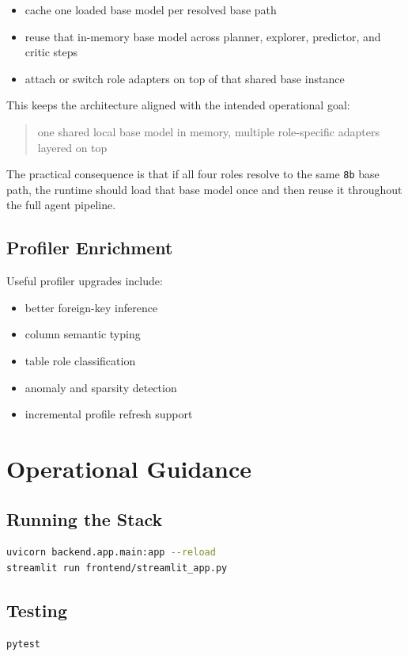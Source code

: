 \documentclass[11pt]{book}
\begin{document}
\begin{itemize}
\item cache one loaded base model per resolved base path
\item reuse that in-memory base model across planner, explorer, predictor, and critic steps
\item attach or switch role adapters on top of that shared base instance
\end{itemize}

This keeps the architecture aligned with the intended operational goal:

\begin{quote}
one shared local base model in memory, multiple role-specific adapters layered on top
\end{quote}

The practical consequence is that if all four roles resolve to the same \texttt{8b} base path, the
runtime should load that base model once and then reuse it throughout the full agent pipeline.

\section{Profiler Enrichment}
Useful profiler upgrades include:

\begin{itemize}
\item better foreign-key inference
\item column semantic typing
\item table role classification
\item anomaly and sparsity detection
\item incremental profile refresh support
\end{itemize}

\chapter{Operational Guidance}
\section{Running the Stack}
\begin{lstlisting}[style=code,language=bash]
uvicorn backend.app.main:app --reload
streamlit run frontend/streamlit_app.py
\end{lstlisting}

\section{Testing}
\begin{lstlisting}[style=code,language=bash]
pytest
\end{lstlisting}
\end{document}
